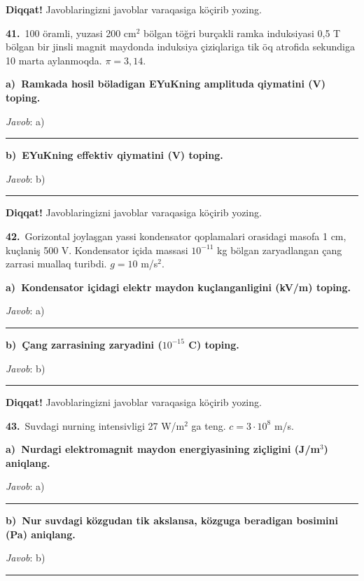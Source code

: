 \documentclass[11pt,a4paper]{article}
\newcommand{\blank}{\rule{5cm}{0.4pt}}
\begin{document}
\medskip\noindent\textbf{Diqqat!} Javoblaringizni javoblar varaqasiga köçirib yozing.\par\vspace{10pt}
\noindent\textbf{41.}\ 100 öramli, yuzasi 200 cm$^2$ bölgan töğri burçakli ramka induksiyasi 0,5 T bölgan bir jinsli magnit maydonda induksiya çiziqlariga tik öq atrofida sekundiga 10 marta aylanmoqda. $\pi=3{,}14$.\par\smallskip
\medskip\noindent\textbf{a)\ Ramkada hosil böladigan EYuKning amplituda qiymatini (V) toping.}\par
\noindent\textit{Javob}: a)\ \blank\par
\medskip\noindent\textbf{b)\ EYuKning effektiv qiymatini (V) toping.}\par
\noindent\textit{Javob}: b)\ \blank\par
\medskip\noindent\textbf{Diqqat!} Javoblaringizni javoblar varaqasiga köçirib yozing.\par\vspace{10pt}
\noindent\textbf{42.}\ Gorizontal joylaşgan yassi kondensator qoplamalari orasidagi masofa 1 cm, kuçlaniş 500 V. Kondensator içida massasi $10^{-11}$ kg bölgan zaryadlangan çang zarrasi muallaq turibdi. $g=10$ m/s$^2$.\par\smallskip
\medskip\noindent\textbf{a)\ Kondensator içidagi elektr maydon kuçlanganligini (kV/m) toping.}\par
\noindent\textit{Javob}: a)\ \blank\par
\medskip\noindent\textbf{b)\ Çang zarrasining zaryadini ($10^{-15}$ C) toping.}\par
\noindent\textit{Javob}: b)\ \blank\par
\medskip\noindent\textbf{Diqqat!} Javoblaringizni javoblar varaqasiga köçirib yozing.\par\vspace{10pt}
\noindent\textbf{43.}\ Suvdagi nurning intensivligi 27 W/m$^2$ ga teng. $c=3\cdot10^8$ m/s.\par\smallskip
\medskip\noindent\textbf{a)\ Nurdagi elektromagnit maydon energiyasining ziçligini (J/m$^3$) aniqlang.}\par
\noindent\textit{Javob}: a)\ \blank\par
\medskip\noindent\textbf{b)\ Nur suvdagi közgudan tik akslansa, közguga beradigan bosimini (Pa) aniqlang.}\par
\noindent\textit{Javob}: b)\ \blank\par
\end{document}
